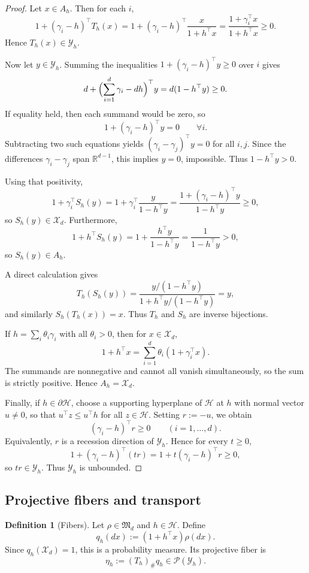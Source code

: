 \documentclass[11pt]{amsart}
\theoremstyle{definition}
\newtheorem{definition}[definition]{Definition}
\newcommand{\R}{\mathbb R}
\newcommand{\cP}{\mathcal P}
\newcommand{\cX}{\mathcal X}
\newcommand{\cY}{\mathcal Y}
\newcommand{\cH}{\mathcal H}
\newcommand{\fM}{\mathfrak M}
\begin{document}
\begin{proof}
Let $x\in A_h$. Then for each $i$,
\[
1+(\gamma_i-h)^\top T_h(x)
=1+(\gamma_i-h)^\top \frac{x}{1+h^\top x}
=\frac{1+\gamma_i^\top x}{1+h^\top x}\ge 0.
\]
Hence $T_h(x)\in\cY_h$.

Now let $y\in\cY_h$. Summing the inequalities $1+(\gamma_i-h)^\top y\ge 0$ over $i$ gives
\[
d+\Bigl(\sum_{i=1}^d \gamma_i-dh\Bigr)^\top y=d(1-h^\top y)\ge 0.
\]
If equality held, then each summand would be zero, so
\[
1+(\gamma_i-h)^\top y=0\qquad \forall i.
\]
Subtracting two such equations yields $(\gamma_i-\gamma_j)^\top y=0$ for all $i,j$. Since the differences $\gamma_i-\gamma_j$ span $\R^{d-1}$, this implies $y=0$, impossible. Thus $1-h^\top y>0$.

Using that positivity,
\[
1+\gamma_i^\top S_h(y)
=1+\gamma_i^\top \frac{y}{1-h^\top y}
=\frac{1+(\gamma_i-h)^\top y}{1-h^\top y}\ge 0,
\]
so $S_h(y)\in\cX_d$. Furthermore,
\[
1+h^\top S_h(y)=1+\frac{h^\top y}{1-h^\top y}=\frac{1}{1-h^\top y}>0,
\]
so $S_h(y)\in A_h$.

A direct calculation gives
\[
T_h(S_h(y))=\frac{y/(1-h^\top y)}{1+h^\top y/(1-h^\top y)}=y,
\]
and similarly $S_h(T_h(x))=x$. Thus $T_h$ and $S_h$ are inverse bijections.

If $h=\sum_i \theta_i\gamma_i$ with all $\theta_i>0$, then for $x\in\cX_d$,
\[
1+h^\top x=\sum_{i=1}^d \theta_i(1+\gamma_i^\top x).
\]
The summands are nonnegative and cannot all vanish simultaneously, so the sum is strictly positive. Hence $A_h=\cX_d$.

Finally, if $h\in\partial \cH$, choose a supporting hyperplane of $\cH$ at $h$ with normal vector $u\neq 0$, so that $u^\top z\le u^\top h$ for all $z\in \cH$. Setting $r:=-u$, we obtain
\[
(\gamma_i-h)^\top r\ge 0\qquad (i=1,\dots,d).
\]
Equivalently, $r$ is a recession direction of $\cY_h$. Hence for every $t\ge 0$,
\[
1+(\gamma_i-h)^\top (tr)=1+t(\gamma_i-h)^\top r\ge 0,
\]
so $tr\in \cY_h$. Thus $\cY_h$ is unbounded.
\end{proof}

\subsection{Projective fibers and transport}

\begin{definition}[Fibers]
Let $\rho\in\fM_d$ and $h\in\cH$. Define
\[
q_h(dx):=(1+h^\top x)\rho(dx).
\]
Since $q_h(\cX_d)=1$, this is a probability measure. Its projective fiber is
\[
\eta_h:=(T_h)_\# q_h\in\cP(\cY_h).
\]
\end{definition}
\end{document}

